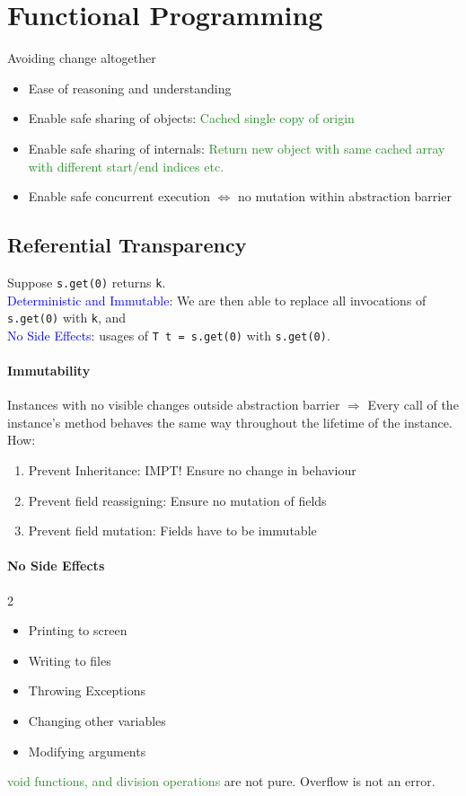 \section{Functional Programming}
Avoiding change altogether
\begin{itemize}
  \item Ease of reasoning and understanding
  \item Enable safe sharing of objects: \textcolor{ForestGreen}{Cached single copy of origin}
  \item Enable safe sharing of internals: \textcolor{ForestGreen}{Return new
    object with same cached array with different start/end indices etc.}
  \item Enable safe concurrent execution \textcolor{Bittersweet}{$\iff$ no
    mutation within abstraction barrier}
\end{itemize}
\subsection{Referential Transparency}
Suppose \verb$s.get(0)$ returns \verb$k$.\\
\textcolor{Blue}{Deterministic and Immutable}: We are then able to replace all invocations of \verb$s.get(0)$
with \verb$k$, and \\
\textcolor{Blue}{No Side Effects}: usages of \verb$T t = s.get(0)$ with \verb$s.get(0)$.
\paragraph{Immutability}
Instances with no visible changes outside abstraction barrier
$\Rightarrow$ Every call of the instance's method behaves the same way
throughout the lifetime of the instance. How:
\begin{enumerate}
  \item Prevent Inheritance: \textcolor{Bittersweet}{IMPT\@! Ensure no change in behaviour}
  \item Prevent field reassigning: Ensure no mutation of fields
  \item Prevent field mutation: Fields have to be immutable
\end{enumerate}
\paragraph{No Side Effects}
\begin{multicols*}{2}
\begin{itemize}
  \item Printing to screen
  \item Writing to files
  \item Throwing Exceptions
\end{itemize}
\begin{itemize}
  \item Changing other variables
  \item Modifying arguments
\end{itemize}
\end{multicols*}
\textcolor{ForestGreen}{void functions, and division operations} are not pure.
\textcolor{Bittersweet}{Overflow} is not an error.
